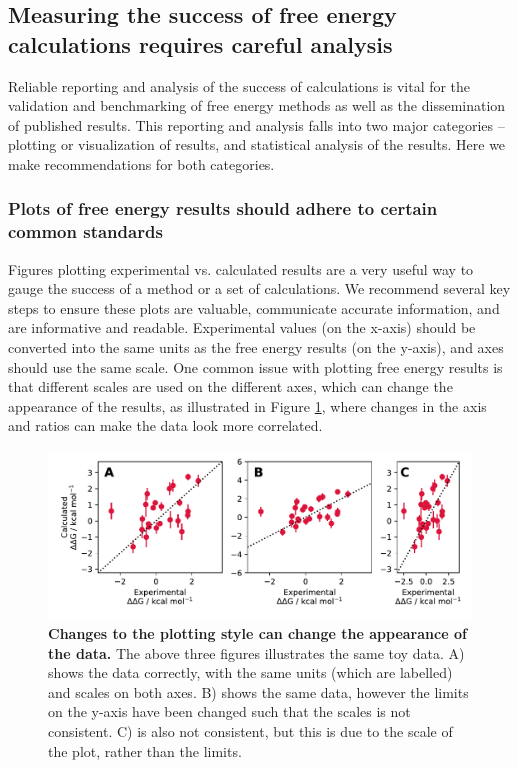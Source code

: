 \documentclass[9pt,bestpractices]{livecoms}
\begin{document}
\subsection{Measuring the success of free energy calculations requires careful analysis}

Reliable reporting and analysis of the success of calculations is vital for the validation and benchmarking of free energy methods as well as the dissemination of published results. This reporting and analysis falls into two major categories -- plotting or visualization of results, and statistical analysis of the results. Here we make recommendations for both categories.

\subsubsection{Plots of free energy results should adhere to certain common standards}
\label{sec:plotting_results}
Figures plotting experimental vs. calculated results are a very useful way to gauge the success of a method or a set of calculations. We recommend several key steps to ensure these plots are valuable, communicate accurate information, and are informative and readable. Experimental values (on the x-axis) should be converted into the same units as the free energy results (on the y-axis), and axes should use the same scale. One common issue with plotting free energy results is that different scales are used on the different axes, which can change the appearance of the results, as illustrated in Figure \ref{fig:plotting-basics}, where changes in the axis and ratios can make the data look more correlated.

\begin{figure}
    \includegraphics[width=0.95\linewidth]{figures/reporting/plotting-basics.pdf}
    \caption{\textbf{Changes to the plotting style can change the appearance of the data.} The above three figures illustrates the same toy data. A) shows the data correctly, with the same units (which are labelled) and scales on both axes. B) shows the same data, however the limits on the y-axis have been changed such that the scales is not consistent. C) is also not consistent, but this is due to the scale of the plot, rather than the limits.}
    \label{fig:plotting-basics}
\end{figure}
\end{document}
